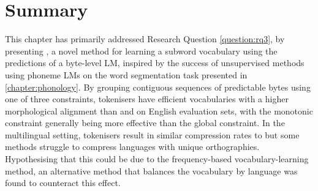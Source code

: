 

\section{Summary}

This chapter has primarily addressed Research Question \ref{question:rq3}, by presenting \bytespan, a novel method for learning a subword vocabulary using the predictions of a byte-level LM, inspired by the success of unsupervised methods using phoneme LMs on the word segmentation task presented in \cref{chapter:phonology}. By grouping contiguous sequences of predictable bytes using one of three constraints, \bytespan tokenisers have efficient vocabularies with a higher morphological alignment than \bpe and \bpewp on English evaluation sets, with the monotonic constraint generally being more effective than the global constraint. In the multilingual setting, \bytespan tokenisers result in similar compression rates to \bpe but some methods struggle to compress languages with unique orthographies. Hypothesising that this could be due to the frequency-based vocabulary-learning method, an alternative method that balances the vocabulary by language was found to counteract this effect.

